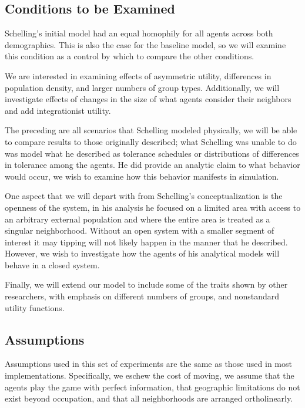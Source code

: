 \documentclass[sigplan,nonacm]{acmart}
\begin{document}
\subsection{Conditions to be Examined}

Schelling's initial model had an equal homophily for all agents across both demographics.
This is also the case for the baseline model, so we will examine this condition as a 
control by which to compare the other conditions.

We are interested in examining effects of asymmetric utility, differences in population density,
and larger numbers of group types. Additionally, we will investigate effects of changes in
the size of what agents consider their neighbors and add integrationist utility.

The preceding are all scenarios that Schelling modeled physically, we will be able to compare
results to those originally described; what Schelling was unable to do was model what he described
as tolerance schedules or distributions of differences in tolerance among the agents.
He did provide an analytic claim to what behavior would occur, 
we wish to examine how this behavior manifests in simulation.

One aspect that we will depart with from Schelling's conceptualization is the openness of the system,
in his analysis he focused on a limited area with access to an arbitrary external population
and where the entire area is treated as a singular neighborhood. Without an open system with 
a smaller segment of interest it may tipping will not likely happen in the manner that he described.
However, we wish to investigate how the agents of his analytical models will behave in a closed system.

Finally, we will extend our model to include some of the traits shown by other researchers,
with emphasis on different numbers of groups, and nonstandard utility functions.

\subsection{Assumptions}

Assumptions used in this set of experiments are the same as those used in most implementations.
Specifically, we eschew the cost of moving, we assume that the agents play the game with perfect information,
that geographic limitations do not exist beyond occupation, and that all neighborhoods are arranged ortholinearly.
\end{document}
